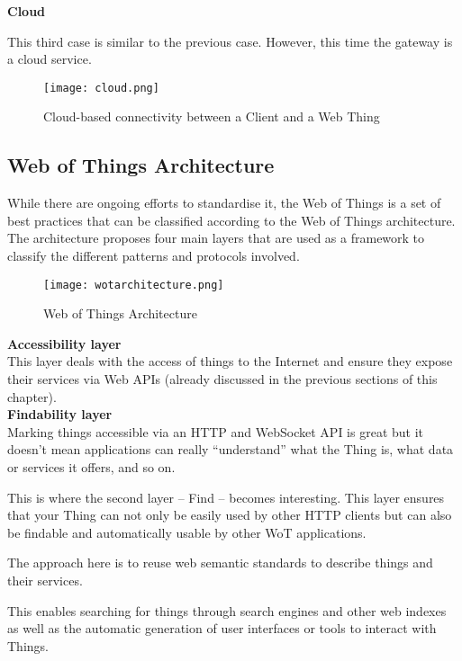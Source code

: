 \textbf{Cloud}

This third case is similar to the previous case. However, this time the gateway
is a cloud service.

\begin{figure}[H]
  \centering
  \texttt{[image: cloud.png]}
  \caption{Cloud-based connectivity between a Client and a Web Thing}
  \label{fig:cloud}
\end{figure}

\subsection{Web of Things Architecture}

While there are ongoing efforts to standardise it, the Web of Things is a set 
of best practices that can be classified according to the Web of Things
architecture.
The architecture proposes four main layers that are used as a framework to
classify the different patterns and protocols involved.

\begin{figure}[H]
  \centering
  \texttt{[image: wotarchitecture.png]}
  \caption{Web of Things Architecture}
  \label{fig:wotarchitecture}
\end{figure}

\textbf{Accessibility layer}\\

This layer deals with the access of things to the
Internet and ensure they expose their services via Web APIs
(already discussed in the previous sections of this chapter).\\

\textbf{Findability layer}\\

Marking things accessible via an HTTP and WebSocket API is great but it doesn't
mean applications can really  ``understand'' what the Thing is, what data or
services it offers, and so on.

This is where the second layer – Find – becomes interesting.
This layer ensures that your Thing can not only be easily used by other HTTP
clients but can also be findable and automatically usable by other WoT
applications.

The approach here is to reuse web semantic standards to describe things and
their services.

This enables searching for things through search engines and other web indexes
as well as the automatic generation of user interfaces or tools to interact
with Things.\\

